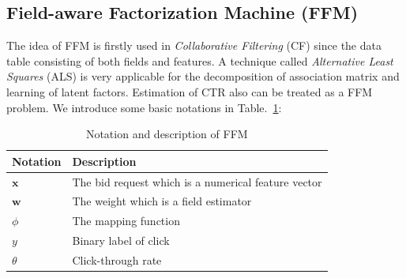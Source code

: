 \subsection{Field-aware Factorization Machine (FFM)}
The idea of FFM is firstly used in \emph{Collaborative Filtering} (CF) since the data table consisting of both fields and features. A technique called \emph{Alternative Least Squares} (ALS) is very applicable for the decomposition of association matrix and learning of latent factors. Estimation of CTR also can be treated as a FFM problem. We introduce some basic notations in Table.~\ref{tab:FFM}:
\begin{table}[H]
\caption{Notation and description of FFM}
\label{tab:FFM}
\begin{center}
\begin{tabular}{ l l } 
\hline
Notation & Description \\
\hline
$\mathbf{x}$ & The bid request which is a numerical feature vector\\
$\mathbf{w}$ & The weight which is a field  estimator \\
$\phi$ & The mapping function \\
$y$ & Binary label of click \\
$\theta$ & Click-through rate \\
\hline
\end{tabular}
\end{center}
\end {table}

